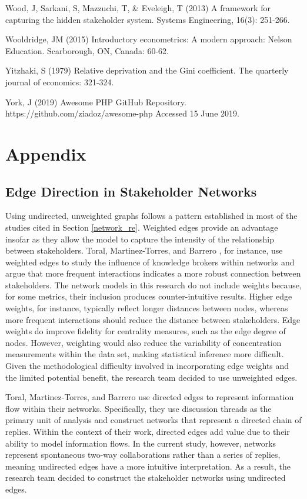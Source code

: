 \begin{thebibliography}{}
Wood, J, Sarkani, S, Mazzuchi, T, \& Eveleigh, T (2013) A framework for capturing the hidden stakeholder system. Systems Engineering, 16(3): 251-266.

Wooldridge, JM (2015) Introductory econometrics: A modern approach: Nelson Education. Scarborough, ON, Canada: 60-62.

Yitzhaki, S (1979) Relative deprivation and the Gini coefficient. The quarterly journal of economics: 321-324.

York, J (2019) Awesome PHP GitHub Repository. https://github.com/ziadoz/awesome-php Accessed 15 June 2019.

\end{thebibliography}

\section*{Appendix}

\subsection*{Edge Direction in Stakeholder Networks}

Using undirected, unweighted graphs follows a pattern established in most of the studies cited in Section \ref{network_re}. Weighted edges provide an advantage insofar as they allow the model to capture the intensity of the relationship between stakeholders. Toral, Martinez-Torres, and Barrero \cite{toral}, for instance, use weighted edges to study the influence of knowledge brokers within networks and argue that more frequent interactions indicates a more robust connection between stakeholders. The network models in this research do not include weights because, for some metrics, their inclusion produces counter-intuitive results. Higher edge weights, for instance, typically reflect longer distances between nodes, whereas more frequent interactions should reduce the distance between stakeholders. Edge weights do improve fidelity for centrality measures, such as the edge degree of nodes. However, weighting would also reduce the variability of concentration measurements within the data set, making statistical inference more difficult. Given the methodological difficulty involved in incorporating edge weights and the limited potential benefit, the research team decided to use unweighted edges.

Toral, Martinez-Torres, and Barrero \cite{toral} use directed edges to represent information flow within their networks. Specifically, they use discussion threads as the primary unit of analysis and construct networks that represent a directed chain of replies. Within the context of their work, directed edges add value due to their ability to model information flows. In the current study, however, networks represent spontaneous two-way collaborations rather than a series of replies, meaning undirected edges have a more intuitive interpretation. As a result, the research team decided to construct the stakeholder networks using undirected edges.

